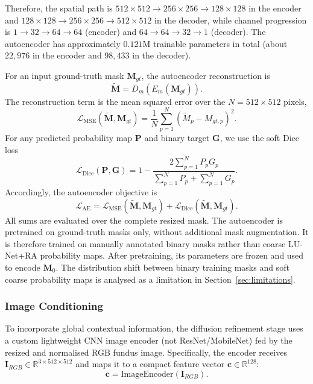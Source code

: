 \documentclass[jimaging,article,submit,pdftex,moreauthors]
  {Definitions/mdpi}
\begin{document}
Therefore, the spatial path is $512\times512\rightarrow256\times256\rightarrow128\times128$ in the encoder and $128\times128\rightarrow256\times256\rightarrow512\times512$ in the decoder, while channel progression is $1\rightarrow32\rightarrow64\rightarrow64$ (encoder) and $64\rightarrow64\rightarrow32\rightarrow1$ (decoder). The autoencoder has approximately $0.121$M trainable parameters in total (about $22{,}976$ in the encoder and $98{,}433$ in the decoder).

For an input ground-truth mask $\mathbf{M}_{gt}$, the autoencoder reconstruction is
\begin{equation}
\tilde{\mathbf{M}}=D_m\!\left(E_m(\mathbf{M}_{gt})\right).
\end{equation}
The reconstruction term is the mean squared error over the $N=512\times512$ pixels,
\begin{equation}
\mathcal{L}_{\text{MSE}}(\tilde{\mathbf{M}},\mathbf{M}_{gt})=
\frac{1}{N}\sum_{p=1}^{N}
\left(\tilde{M}_{p}-M_{gt,p}\right)^2.
\end{equation}
For any predicted probability map $\mathbf{P}$ and binary target $\mathbf{G}$, we use the soft Dice loss
\begin{equation}
\mathcal{L}_{\text{Dice}}(\mathbf{P},\mathbf{G})=
1-\frac{2\sum_{p=1}^{N}P_pG_p}
{\sum_{p=1}^{N}P_p+\sum_{p=1}^{N}G_p}.
\end{equation}
Accordingly, the autoencoder objective is
\begin{equation}
\mathcal{L}_{\text{AE}} =
\mathcal{L}_{\text{MSE}}(\tilde{\mathbf{M}},\mathbf{M}_{gt})+
\mathcal{L}_{\text{Dice}}(\tilde{\mathbf{M}},\mathbf{M}_{gt}).
\end{equation}
All sums are evaluated over the complete resized mask. The autoencoder is pretrained on ground-truth masks only, without additional mask augmentation. It is therefore trained on manually annotated binary masks rather than coarse LU-Net+RA probability maps. After pretraining, its parameters are frozen and used to encode $\mathbf{M}_0$. The distribution shift between binary training masks and soft coarse probability maps is analysed as a limitation in Section~\ref{sec:limitations}.

\subsubsection{Image Conditioning}

To incorporate global contextual information, the diffusion refinement stage uses a custom lightweight CNN image encoder (not ResNet/MobileNet) fed by the resized and normalised RGB fundus image. Specifically, the encoder receives $\mathbf{I}_{RGB}\in\mathbb{R}^{3\times512\times512}$ and maps it to a compact feature vector $\mathbf{c}\in\mathbb{R}^{128}$:
\begin{equation}
\mathbf{c}=\mathrm{ImageEncoder}(\mathbf{I}_{RGB}).
\end{equation}
\end{document}
